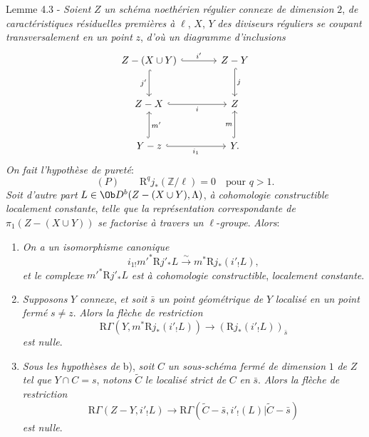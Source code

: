 \begin{statement}{Lemme 4.3 -}
\emph{Soient} $Z$ \emph{un schéma noethérien régulier connexe de dimension} $2$, \emph{de caractéristiques résiduelles premières à} $\ell$, $X$, $Y$ \emph{des diviseurs réguliers se coupant transversalement en un point} $z$, \emph{d'où un diagramme d'inclusions}
\[
\begin{tikzcd}[column sep=large,row sep=large]
Z-(X\cup Y) \arrow[r,hook,"i'"] \arrow[d,hook,"j'"'] & Z-Y \arrow[d,hook,"j"]\\
Z-X \arrow[r,hook,"i"'] & Z\\
Y-z \arrow[r,hook,"i_1"'] \arrow[u,hook,"m'"'] & Y \arrow[u,hook,"m"] .
\end{tikzcd}
\]
\emph{On fait l'hypothèse de pureté}:
\[
(P)\qquad \mathrm{R}^qj_*(\mathbb{Z}/\ell)=0\quad\text{pour }q>1.
\]
\emph{Soit d'autre part} $L\in\Ob D^b(Z-(X\cup Y),\Lambda)$, \emph{à cohomologie constructible localement constante}, \emph{telle que la représentation correspondante de} $\pi_1(Z-(X\cup Y))$ \emph{se factorise à travers un} $\ell$-\emph{groupe}. \emph{Alors}:
\begin{enumerate}[label=\alph*)]
\item \emph{On a un isomorphisme canonique}
\[
i_{1!}m'^*\mathrm{R} j'_*L\xrightarrow{\sim} m^*\mathrm{R} j_*(i'_!L),
\]
\emph{et le complexe} $m'^*\mathrm{R} j'_*L$ \emph{est à cohomologie constructible}, \emph{localement constante}.
\item \emph{Supposons} $Y$ \emph{connexe}, \emph{et soit} $\bar s$ \emph{un point géométrique de} $Y$ \emph{localisé en un point fermé} $s\ne z$. \emph{Alors la flèche de restriction}
\begin{equation}
\mathrm{R}\Gamma(Y,m^*\mathrm{R} j_*(i'_!L))\longrightarrow (\mathrm{R} j_*(i'_!L))_{\bar s}
\tag{4.3.1}
\end{equation}
\emph{est nulle}.
\item \emph{Sous les hypothèses de} b), \emph{soit} $C$ \emph{un sous-schéma fermé de dimension} $1$ \emph{de} $Z$ \emph{tel que} $Y\cap C=s$, \emph{notons} $\widetilde C$ \emph{le localisé strict de} $C$ \emph{en} $\bar s$. \emph{Alors la flèche de restriction}
\begin{equation}
\mathrm{R}\Gamma(Z-Y,i'_!L)
\longrightarrow
\mathrm{R}\Gamma(\widetilde C-\bar s,i'_!(L)|\widetilde C-\bar s)
\tag{4.3.2}
\end{equation}
\emph{est nulle}.
\end{enumerate}
\end{statement}

